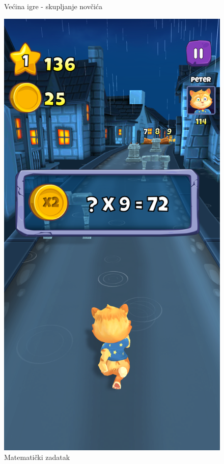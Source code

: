 \documentclass[times, utf8, zavrsni]{fer}
\begin{document}
\begin{figure}[!htb]
\begin{minipage}{0.48\textwidth}
			\caption{Većina igre - skupljanje novčića}
			\label{fig:skupljewnjenovcica}
		\end{minipage}\hfill
		\begin{minipage}{0.48\textwidth}
			\centering
			\includegraphics[scale=0.15]{"slike/igre/toonmath2.png"} 
			\caption{Matematički zadatak}
			\label{fig:toonmathmath}
		\end{minipage}
	\end{figure}
 
\end{document}

